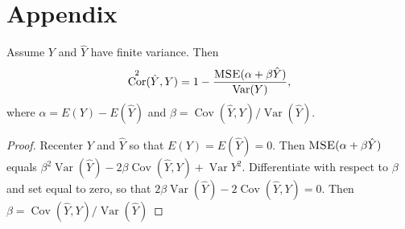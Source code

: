 \documentclass[twoside]{article}
\DeclareMathOperator{\Var}{Var}
\DeclareMathOperator{\Cor}{Cor}
\DeclareMathOperator{\Cov}{Cov}
\DeclareMathOperator{\MSE}{\textsc{MSE}}
\begin{document}
\section*{Appendix}

\begin{lem}
\label{lem:r^2 and correlation}Assume $Y$ and $\hat{Y}$ have finite
variance. Then 
\begin{equation}
\Cor^{2}(\hat{Y},Y)=1-\frac{\MSE(\alpha+\beta\hat{Y})}{\Var(Y)},\label{eq:rsq and correlation}
\end{equation}
where $\alpha=E(Y)-E(\hat{Y})$ and $\beta=\Cov(\hat{Y},Y)/\Var(\hat{Y})$.
\end{lem}

\begin{proof}
Recenter $Y$ and $\hat{Y}$ so that $E(Y)=E(\hat{Y})=0$. Then $\MSE(\alpha+\beta\hat{Y})$ equals $\beta^{2}\Var(\hat{Y})-2\beta\Cov(\hat{Y},Y)+\Var Y^{2}$.
Differentiate with respect to $\beta$ and set equal to zero, so that
$2\beta\Var(\hat{Y})-2\Cov(\hat{Y},Y)=0$. Then $\beta=\Cov(\hat{Y},Y)/\Var(\hat{Y})$
\end{proof}
\end{document}
